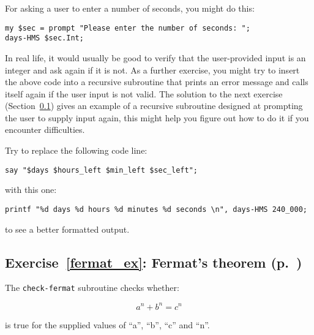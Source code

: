 For asking a user to enter a number of seconds, you might 
do this:

\begin{verbatim}
my $sec = prompt "Please enter the number of seconds: ";
days-HMS $sec.Int;
\end{verbatim}

In real life, it would usually be good to verify that the 
user-provided input is an integer and ask again if it is 
not. As a further exercise, you might try to insert the 
above code into a recursive subroutine that prints an 
error message and calls itself again if the user input is 
not valid. The solution to the next exercise 
(Section~\ref{sol_fermat_ex}) gives an example of a recursive 
subroutine designed at prompting 
the user to supply input again, this might help you figure 
out how to do it if you encounter difficulties. 

Try to replace the following code line:
\begin{verbatim}
say "$days $hours_left $min_left $sec_left"; 
\end{verbatim}
%
with this one:

\begin{verbatim}
printf "%d days %d hours %d minutes %d seconds \n", days-HMS 240_000;
\end{verbatim}
to see a better formatted output.

\subsection{Exercise~\ref{fermat_ex}: Fermat's theorem (p.~\pageref{fermat_ex})}
\label{sol_fermat_ex}

The {\tt check-fermat} subroutine checks whether:

\[ a^n + b^n = c^n \]
%

is true for the supplied values of ``a'', ``b'', ``c'' and 
``n''.

